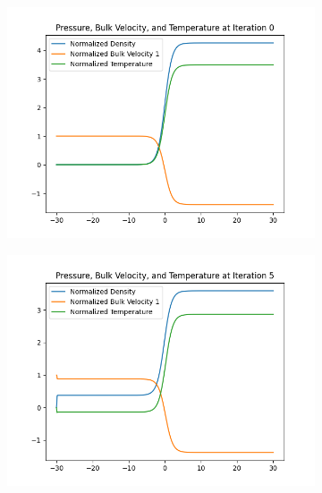 \documentclass{article}
\begin{document}
\begin{figure}[H]
    \centering
    \begin{subfigure}[b]{0.45\textwidth}
    \includegraphics[width=\textwidth]{imgs/iter0.png}
        \label{fig:image1}
    \end{subfigure}
    \hfill
    \begin{subfigure}[b]{0.45\textwidth}
    \includegraphics[width=\textwidth]{imgs/iter5.png}
        \label{fig:image2}
    \end{subfigure}
    
    \vspace{1em} %
    

\end{figure}
\end{document}
